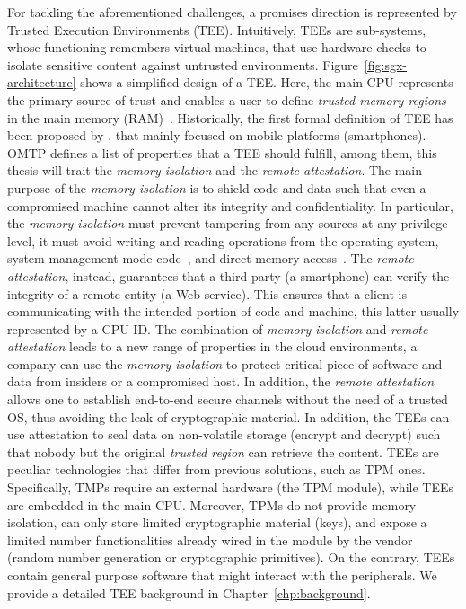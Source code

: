 For tackling the aforementioned challenges, a promises direction is 
represented by Trusted Execution Environments (TEE).
Intuitively, TEEs are sub-systems, whose functioning remembers virtual 
machines, that use hardware checks to isolate sensitive content against 
untrusted environments.
Figure~\ref{fig:sgx-architecture} shows a simplified design of a TEE.
Here, the main CPU represents the primary source of trust and enables a user to 
define \emph{trusted memory regions} in the main memory 
(RAM)~\citep{Sabt2015TrustedEE}.
Historically, the first formal definition of TEE has been proposed by 
\cite{omtp}, that mainly focused on mobile platforms (\eg smartphones).
OMTP defines a list of properties that a TEE should fulfill, among them, this 
thesis will trait the \emph{memory isolation} and the \emph{remote attestation}.
The main purpose of the \emph{memory isolation} is to shield code and data such 
that even a compromised machine cannot alter its integrity and confidentiality.
In particular, the \emph{memory isolation} must prevent tampering from any 
sources at any privilege level, \eg it must avoid writing and reading 
operations from the operating system, system management mode 
code~\citep{yao2009system}, and direct memory 
access~\citep{coke1998implementing}.
The \emph{remote attestation}, instead, guarantees that a third party (\eg a 
smartphone) can verify the integrity of a remote entity (\eg a Web service).
This ensures that a client is communicating with the intended portion of code 
and machine, this latter usually represented by a CPU ID.
The combination of \emph{memory isolation} and \emph{remote attestation} leads 
to a new range of properties in the cloud environments, \ie a company 
can use the \emph{memory isolation} to protect critical piece of 
software and data from insiders or a compromised host.
In addition, the \emph{remote attestation} allows one to establish 
end-to-end secure channels without the need of a trusted OS, thus avoiding the 
leak of cryptographic material.
In addition, the TEEs can use attestation to seal data on non-volatile storage 
(\ie encrypt and decrypt) such that nobody but the original \emph{trusted 
region} can retrieve the content. 
TEEs are peculiar technologies that differ from previous solutions, such as TPM 
ones. Specifically, TMPs require an external hardware (\ie the TPM module), 
while TEEs are embedded in the main CPU.
Moreover, TPMs do not provide memory isolation, can only store limited 
cryptographic material (\eg keys), and expose a limited number functionalities 
already wired in the module by the vendor
(\eg random number generation or cryptographic primitives).
On the contrary, TEEs contain general purpose software that might 
interact with the peripherals.
We provide a detailed TEE background in Chapter~\ref{chp:background}.

